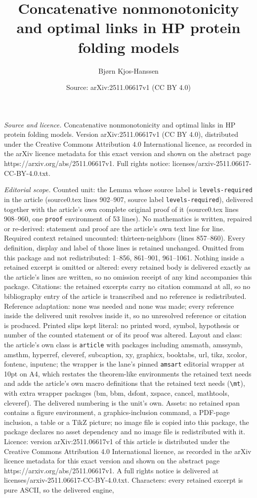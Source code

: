 \documentclass[10pt,a4paper]{amsart}
\title[Concatenative nonmonotonicity and optimal links in HP protei]{Concatenative nonmonotonicity and optimal links in HP protein folding models}
\author{Bj{\o}rn Kjos-Hanssen}
\date{Source: arXiv:2511.06617v1 (CC BY 4.0)}
\begin{document}
\maketitle

\noindent\emph{Source and licence.} Concatenative nonmonotonicity and optimal links in HP protein folding models. Version arXiv:2511.06617v1 (CC BY 4.0), distributed under the Creative Commons Attribution 4.0 International licence, as recorded in the arXiv licence metadata for this exact version and shown on the abstract page https://arxiv.org/abs/2511.06617v1. Full rights notice: licenses/arxiv-2511.06617-CC-BY-4.0.txt.\par\smallskip

\noindent\textit{Editorial scope.} Counted unit: the Lemma whose source label is \texttt{levels-required} in the article (source0.tex lines 902--907, source label \texttt{levels-required}), delivered together with the article's own complete original proof of it (source0.tex lines 908--960, one \texttt{proof} environment of 53 lines). No mathematics is written, repaired or re-derived: statement and proof are the article's own text line for line. Required context retained uncounted: thirteen-neighbors (lines 857--860). Every definition, display and label of those lines is retained unchanged. Omitted from this package and not redistributed: 1--856, 861--901, 961--1061. Nothing inside a retained excerpt is omitted or altered: every retained body is delivered exactly as the article's lines are written, so no omission receipt of any kind accompanies this package. Citations: the retained excerpts carry no citation command at all, so no bibliography entry of the article is transcribed and no reference is redistributed. Reference adaptation: none was needed and none was made; every reference inside the delivered unit resolves inside it, so no unresolved reference or citation is produced. Printed slips kept literal: no printed word, symbol, hypothesis or number of the counted statement or of its proof was altered. Layout and class: the article's own class is \texttt{article} with packages including amsmath, amssymb, amsthm, hyperref, cleveref, subcaption, xy, graphicx, booktabs, url, tikz, xcolor, fontenc, inputenc; the wrapper is the lane's pinned \texttt{amsart} editorial wrapper at 10pt on A4, which restates the theorem-like environments the retained text needs and adds the article's own macro definitions that the retained text needs (\texttt{\textbackslash mt}), with extra wrapper packages (bm, bbm, dsfont, xspace, cancel, mathtools, cleveref). The delivered numbering is the unit's own. Assets: no retained span contains a figure environment, a graphics-inclusion command, a PDF-page inclusion, a table or a TikZ picture; no image file is copied into this package, the package declares no asset dependency and no image file is redistributed with it. Licence: version arXiv:2511.06617v1 of this article is distributed under the Creative Commons Attribution 4.0 International licence, as recorded in the arXiv licence metadata for this exact version and shown on the abstract page https://arxiv.org/abs/2511.06617v1. A full rights notice is delivered at licenses/arxiv-2511.06617-CC-BY-4.0.txt. Characters: every retained excerpt is pure ASCII, so the delivered engine, 
\end{document}
